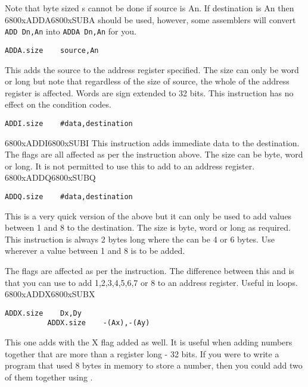 Note that byte sized s cannot be done if source is An. If
      destination is An then \mc6800x{ADDA}\mc6800x{SUBA} should be used, however, some assemblers
      will convert \lstinline{ADD Dn,An} into \lstinline{ADDA Dn,An} for you.

\begin{lstlisting}[firstnumber=1,]
          ADDA.size    source,An
\end{lstlisting}

This adds the source to the address register specified. The size
      can only be word or long but note that regardless of the size of source,
      the whole of the address register is affected. Words are sign extended
      to 32 bits. This instruction has no effect on the condition
      codes.

\begin{lstlisting}[firstnumber=1,]
          ADDI.size    #data,destination
\end{lstlisting}
\mc6800x{ADDI}\mc6800x{SUBI}
This instruction adds immediate data to the destination. The flags
      are all affected as per the  instruction above. The size can be byte,
      word or long. It is not permitted to use this to add to an address
      register.
\mc6800x{ADDQ}\mc6800x{SUBQ}
\begin{lstlisting}[firstnumber=1,]
          ADDQ.size    #data,destination
\end{lstlisting}

This is a very quick version of the above  but it can only be
      used to add values between 1 and 8 to the destination. The size is byte,
      word or long as required. This instruction is always 2 bytes long where
      the  can be 4 or 6 bytes. Use  wherever a value between 1 and 8
      is to be added.

The flags are affected as per the  instruction. The difference
      between this and  is that you can use  to add 1,2,3,4,5,6,7 or 8
      to an address register. Useful in loops.
\mc6800x{ADDX}\mc6800x{SUBX}
\begin{lstlisting}[firstnumber=1,]
          ADDX.size    Dx,Dy
          ADDX.size    -(Ax),-(Ay)
\end{lstlisting}

This one adds with the X flag added as well. It is useful when
      adding numbers together that are more than a register long -{} 32 bits. If
      you were to write a program that used 8 bytes in memory to store a
      number, then you could add two of them together using .

